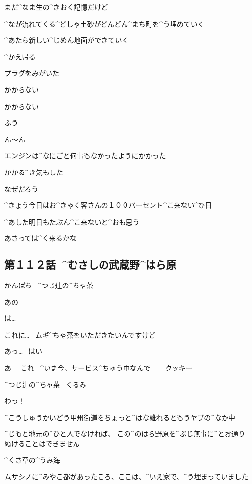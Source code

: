 \Alpha まだ^{なま}{生}の^{きおく}{記憶}だけど

\Alpha ^{なが}{流}れてくる^{どしゃ}{土砂}がどんどん^{まち}{町}を^{う}{埋}めていく

\Alpha ^{あたら}{新}しい^{じめん}{地面}ができていく

\page[12]
\Alpha ^{かえ}{帰}る

\page[13]
\Alpha プラグをみがいた

\Alpha かからない

\Alpha かからない

\Alpha ふう

\page[14]
\Alpha ん〜ん

\page[16]
\Alpha エンジンは^{なにごと}{何事}もなかったようにかかった

\Alpha かかる^{き}{気}もした

\Alpha なぜだろう

\page[17]
\Alpha ^{きょう}{今日}はお^{きゃく}{客}さんの１００パーセント^{こ}{来}ない^{ひ}{日}

\page[18]
\Alpha ^{あした}{明日}もたぶん^{こ}{来}ないと^{おも}{思}う

\Alpha あさっては^{く}{来}るかな


\subsection{第１１２話\ ^{むさしの}{武蔵野}^{はら}{原}}

\page[22]
\Sign かんぱち
\ ^{つじ}{辻}の^{ちゃ}{茶}

\Kokone あの

\Person は…

\Kokone これに…
\ ムギ^{ちゃ}{茶}をいただきたいんですけど

\Person あっ…
\ はい

\page[23]
\Person あ……これ
\ ^{いま}{今}、サービス^{ちゅう}{中}なんで……
\ クッキー

\Sign ^{つじ}{辻}の^{ちゃ}{茶}
\ くるみ

\Kokone わっ！

\page[24]
\Kokone ^{こうしゅうかいどう}{甲州街道}をちょっと^{はな}{離}れるともうヤブの^{なか}{中}

\Kokone ^{じもと}{地元}の^{ひと}{人}でなければ、
この^{のはら}{野原}を^{ぶじ}{無事}に^{とお}{通}りぬけることはできません

\page[25]
\Kokone ^{くさ}{草}の^{うみ}{海}

\Kokone ムサシノに^{みやこ}{都}があったころ、ここは、^{いえ}{家}で、^{う}{埋}まっていました

